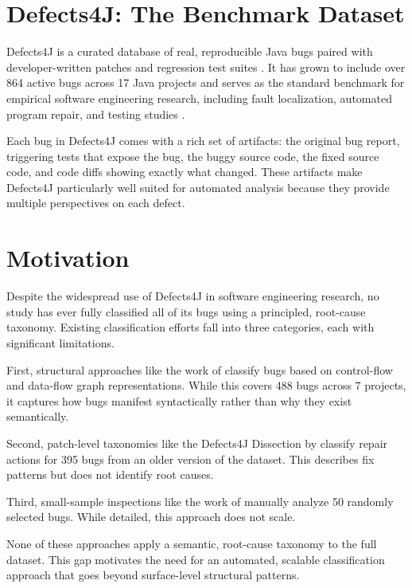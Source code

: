 \documentclass{iutbscthesis}
\begin{document}
\section{Defects4J: The Benchmark Dataset}

Defects4J is a curated database of real, reproducible Java bugs paired with developer-written patches and regression test suites \cite{just2014defects4j}. It has grown to include over 864 active bugs across 17 Java projects and serves as the standard benchmark for empirical software engineering research, including fault localization, automated program repair, and testing studies \cite{rafi2024revisiting, durieux2018automatic}.

Each bug in Defects4J comes with a rich set of artifacts: the original bug report, triggering tests that expose the bug, the buggy source code, the fixed source code, and code diffs showing exactly what changed. These artifacts make Defects4J particularly well suited for automated analysis because they provide multiple perspectives on each defect.

\section{Motivation}

Despite the widespread use of Defects4J in software engineering research, no study has ever fully classified all of its bugs using a principled, root-cause taxonomy. Existing classification efforts fall into three categories, each with significant limitations.

First, structural approaches like the work of \textcite{vanderspuy2025anatomy} classify bugs based on control-flow and data-flow graph representations. While this covers 488 bugs across 7 projects, it captures how bugs manifest syntactically rather than why they exist semantically.

Second, patch-level taxonomies like the Defects4J Dissection by \textcite{sobreira2018dissection} classify repair actions for 395 bugs from an older version of the dataset. This describes fix patterns but does not identify root causes.

Third, small-sample inspections like the work of \textcite{xuan2017better} manually analyze 50 randomly selected bugs. While detailed, this approach does not scale.

None of these approaches apply a semantic, root-cause taxonomy to the full dataset. This gap motivates the need for an automated, scalable classification approach that goes beyond surface-level structural patterns.
\end{document}
